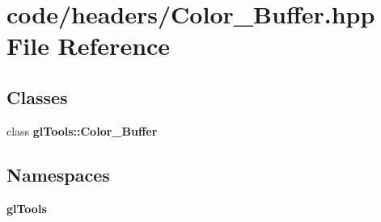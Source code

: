 \section{code/headers/\+Color\+\_\+\+Buffer.hpp File Reference}
\label{_color___buffer_8hpp}
\subsection*{Classes}
\begin{DoxyCompactItemize}
\item 
class \textbf{ gl\+Tools\+::\+Color\+\_\+\+Buffer}
\end{DoxyCompactItemize}
\subsection*{Namespaces}
\begin{DoxyCompactItemize}
\item 
 \textbf{ gl\+Tools}
\end{DoxyCompactItemize}
